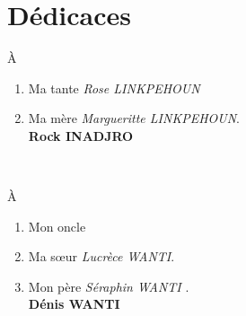 \documentclass[12pt,a4paper,openay]{book}
\numberwithin{equation}{chapter}
\begin{document}
	
	\frontmatter
	
	
	
	\chapter{D\'edicaces}
		
		\begin{minipage}{0.5\textwidth}
		\centering
				\`A	\\[0.6cm]
			\begin{enumerate}
				\item[\ding{76}] Ma tante \textit{Rose LINKPEHOUN}
				\item[\ding{76}] Ma m\`ere \textit{Margueritte LINKPEHOUN}.\\[0.6cm]
				\hspace*{0.8cm}	\textbf{Rock INADJRO}
			\end{enumerate}
		\end{minipage}
		\hfill\\[2cm]
			\begin{flushright}
			\begin{minipage}{0.5\textwidth}
				\centering
					\`A\\[0.6cm]
				
				\begin{enumerate}
					\item[\ding{76}] Mon oncle 				
					\item[\ding{76}] Ma s\oe{}ur  \textit{Lucr\`ece WANTI}.
					\item[\ding{76}] Mon p\`ere \textit{S\'eraphin WANTI }.\\[0.6cm] 
					\hspace*{1cm}	\textbf{Dénis WANTI}
				\end{enumerate}
			
				\end{minipage}
			\end{flushright}	
			\newpage
			
\end{document}
